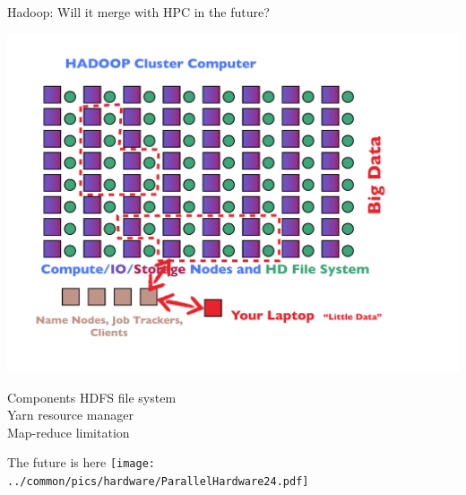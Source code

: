 \begin{frame}{Hadoop: Will it merge with HPC in the future?}
\begin{minipage}{8.5cm}
  \includegraphics[trim=2cm 0cm 0cm 0cm,clip=true,height=0.8\textheight]
  {../common/pics/hardware/ParallelHardware23.pdf}
\end{minipage}
\begin{minipage}{3cm}\small
  \begin{block}{Components}\pause
    \scriptsize HDFS file system\\
    Yarn resource manager \\
    Map-reduce limitation
  \end{block}
\end{minipage}
\end{frame}

\begin{frame}{The future is here}
\texttt{[image: ../common/pics/hardware/ParallelHardware24.pdf]}
\end{frame}



